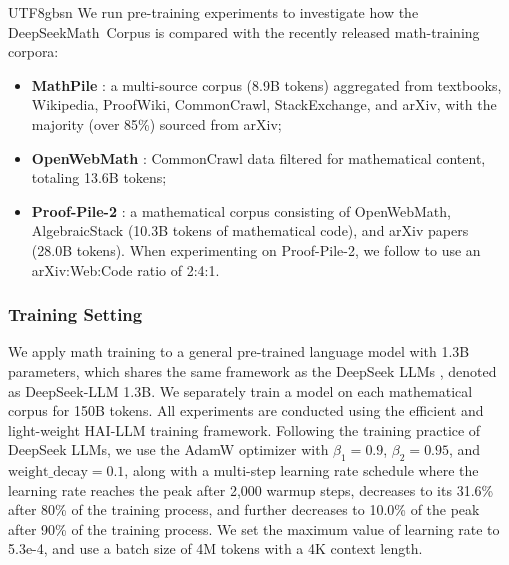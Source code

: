 \documentclass[11pt, a4paper, logo, copyright, nonumbering]{deepseek}
\newcommand{\spmath}{DeepSeekMath}
\begin{document}
\begin{CJK*}{UTF8}{gbsn}
We run pre-training experiments to investigate how the \spmath~Corpus is compared with the recently released math-training corpora:
\begin{itemize}[topsep=0pt]
    \item \textbf{MathPile} \citep{mathpile}: a multi-source corpus (8.9B tokens) aggregated from textbooks, Wikipedia, ProofWiki, CommonCrawl, StackExchange, and arXiv, with the majority (over 85\%) sourced from arXiv;
    \item \textbf{OpenWebMath} \citep{openwebmath}: CommonCrawl data filtered for mathematical content, totaling 13.6B tokens;
    \item \textbf{Proof-Pile-2} \citep{llemma}: a mathematical corpus consisting of OpenWebMath, AlgebraicStack (10.3B tokens of mathematical code), and arXiv papers (28.0B tokens).
    When experimenting on Proof-Pile-2, we follow \cite{llemma} to use an arXiv:Web:Code ratio of 2:4:1.
\end{itemize}

\subsubsection{Training Setting}
\label{sec:quality-policy}
We apply math training to a general pre-trained language model with 1.3B parameters, which shares the same framework as the DeepSeek LLMs \citep{deepseek-llm}, denoted as DeepSeek-LLM 1.3B.
We separately train a model on each mathematical corpus for 150B tokens. All experiments are conducted using the efficient and light-weight HAI-LLM \citep{haillm} training framework.
Following the training practice of DeepSeek LLMs, we use the AdamW optimizer \citep{adamW} with $\beta_1=0.9$, $\beta_2=0.95$, and $\mathrm{weight\_decay}=0.1$, along with a multi-step learning rate schedule where the learning rate reaches the peak after 2,000 warmup steps, decreases to its 31.6\% after 80\% of the training process, and further decreases to 10.0\% of the peak after 90\% of the training process.
We set the maximum value of learning rate to 5.3e-4, and use a batch size of 4M tokens with a 4K context length.



\end{CJK*}
\end{document}
